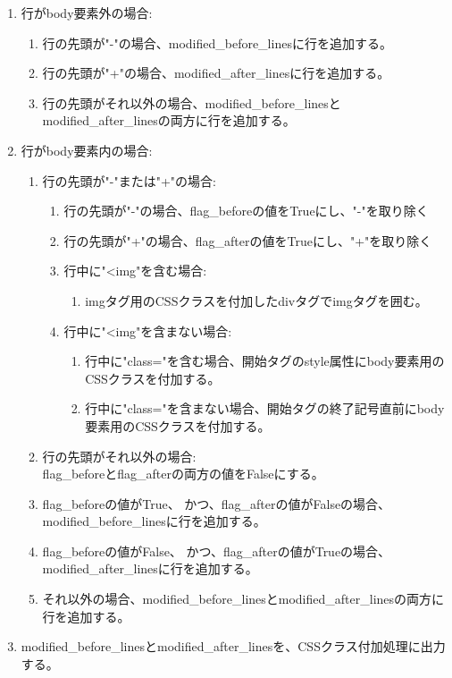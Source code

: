 \begin{enumerate}
    \item 行がbody要素外の場合:
          \begin{enumerate}
              \item 行の先頭が"-"の場合、modified\_before\_linesに行を追加する。
              \item 行の先頭が"+"の場合、modified\_after\_linesに行を追加する。
              \item 行の先頭がそれ以外の場合、modified\_before\_linesとmodified\_after\_linesの両方に行を追加する。
          \end{enumerate}
    \item 行がbody要素内の場合:
          \begin{enumerate}
              \item 行の先頭が"-"または"+"の場合:
                    \begin{enumerate}
                        \item 行の先頭が"-"の場合、flag\_beforeの値をTrueにし、"-"を取り除く
                        \item 行の先頭が"+"の場合、flag\_afterの値をTrueにし、"+"を取り除く
                        \item 行中に"\textless img"を含む場合:
                              \begin{enumerate}
                                  \item imgタグ用のCSSクラスを付加したdivタグでimgタグを囲む。
                              \end{enumerate}
                        \item 行中に"\textless img"を含まない場合:
                              \begin{enumerate}
                                  \item 行中に"class="を含む場合、開始タグのstyle属性にbody要素用のCSSクラスを付加する。
                                  \item 行中に"class="を含まない場合、開始タグの終了記号直前にbody要素用のCSSクラスを付加する。
                              \end{enumerate}
                    \end{enumerate}
              \item 行の先頭がそれ以外の場合:\\
                    flag\_beforeとflag\_afterの両方の値をFalseにする。
              \item flag\_beforeの値がTrue、 かつ、flag\_afterの値がFalseの場合、modified\_before\_linesに行を追加する。
              \item flag\_beforeの値がFalse、 かつ、flag\_afterの値がTrueの場合、modified\_after\_linesに行を追加する。
              \item それ以外の場合、modified\_before\_linesとmodified\_after\_linesの両方に行を追加する。
          \end{enumerate}
    \item modified\_before\_linesとmodified\_after\_linesを、CSSクラス付加処理に出力する。
\end{enumerate}

